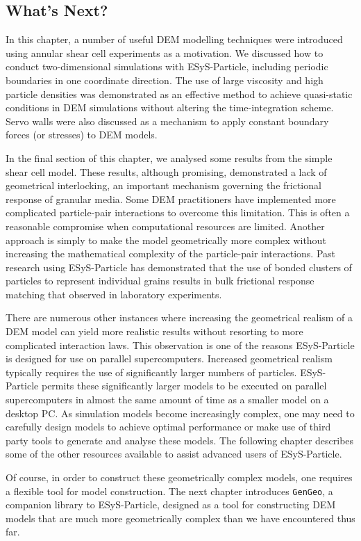 \subsection*{What's Next?}

In this chapter, a number of useful DEM modelling techniques were introduced using annular shear cell experiments as a motivation. We discussed how to conduct two-dimensional simulations with ESyS-Particle, including periodic boundaries in one coordinate direction. The use of large viscosity and high particle densities was demonstrated as an effective method to achieve quasi-static conditions in DEM simulations without altering the time-integration scheme. Servo walls were also discussed as a mechanism to apply constant boundary forces (or stresses) to DEM models. 

In the final section of this chapter, we analysed some results from the simple shear cell model. These results, although promising, demonstrated a lack of geometrical interlocking, an important mechanism governing the frictional response of granular media. Some DEM practitioners have implemented more complicated particle-pair interactions to overcome this limitation. This is often a reasonable compromise when computational resources are limited. Another approach is simply to make the model geometrically more complex without increasing the mathematical complexity of the particle-pair interactions. Past research using ESyS-Particle has demonstrated that the use of bonded clusters of particles to represent individual grains results in bulk frictional response matching that observed in laboratory experiments. 

There are numerous other instances where increasing the geometrical realism of a DEM model can yield more realistic results without resorting to more complicated interaction laws. This observation is one of the reasons ESyS-Particle is designed for use on parallel supercomputers. Increased geometrical realism typically requires the use of significantly larger numbers of particles. ESyS-Particle permits these significantly larger models to be executed on parallel supercomputers in almost the same amount of time as a smaller model on a desktop PC. 
As simulation models become increasingly complex, one may need to carefully design models to achieve optimal performance or make use of third party tools to generate and analyse these models. The following chapter describes some of the other resources available to assist advanced users of ESyS-Particle.

Of course, in order to construct these geometrically complex models, one requires a flexible tool for model construction. The next chapter introduces \texttt{GenGeo}, a companion library to ESyS-Particle, designed as a tool for constructing DEM models that are much more geometrically complex than we have encountered thus far.


\newpage

